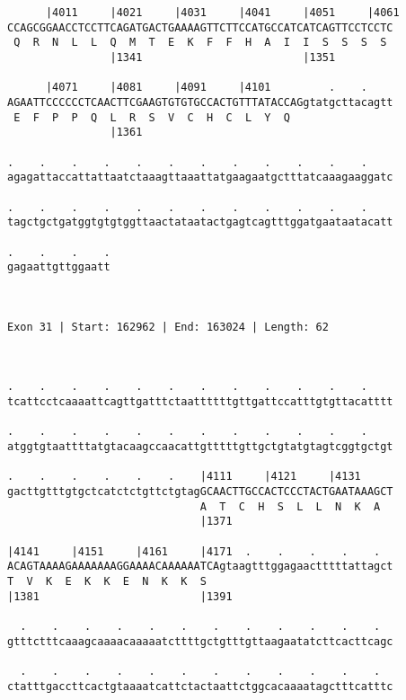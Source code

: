 \documentclass{article}
\begin{document}
\begin{Verbatim}
      |4011     |4021     |4031     |4041     |4051     |4061
CCAGCGGAACCTCCTTCAGATGACTGAAAAGTTCTTCCATGCCATCATCAGTTCCTCCTC
 Q  R  N  L  L  Q  M  T  E  K  F  F  H  A  I  I  S  S  S  S 
                |1341                         |1351         
  
      |4071     |4081     |4091     |4101         .    .    
AGAATTCCCCCCTCAACTTCGAAGTGTGTGCCACTGTTTATACCAGgtatgcttacagtt
 E  F  P  P  Q  L  R  S  V  C  H  C  L  Y  Q                
                |1361                                       
  
.    .    .    .    .    .    .    .    .    .    .    .    
agagattaccattattaatctaaagttaaattatgaagaatgctttatcaaagaaggatc
                                                            
.    .    .    .    .    .    .    .    .    .    .    .    
tagctgctgatggtgtgtggttaactataatactgagtcagtttggatgaataatacatt
                                                            
.    .    .    .
gagaattgttggaatt
                
                
 
Exon 31 | Start: 162962 | End: 163024 | Length: 62



.    .    .    .    .    .    .    .    .    .    .    .    
tcattcctcaaaattcagttgatttctaattttttgttgattccatttgtgttacatttt
                                                            
.    .    .    .    .    .    .    .    .    .    .    .    
atggtgtaattttatgtacaagccaacattgtttttgttgctgtatgtagtcggtgctgt
                                                            
.    .    .    .    .    .    |4111     |4121     |4131     
gacttgtttgtgctcatctctgttctgtagGCAACTTGCCACTCCCTACTGAATAAAGCT
                              A  T  C  H  S  L  L  N  K  A  
                              |1371                         
  
|4141     |4151     |4161     |4171  .    .    .    .    .  
ACAGTAAAAGAAAAAAAGGAAAACAAAAAATCAgtaagtttggagaactttttattagct
T  V  K  E  K  K  E  N  K  K  S                             
|1381                         |1391                         
  
  .    .    .    .    .    .    .    .    .    .    .    .  
gtttctttcaaagcaaaacaaaaatcttttgctgtttgttaagaatatcttcacttcagc
                                                            
  .    .    .    .    .    .    .    .    .    .    .    .  
ctatttgaccttcactgtaaaatcattctactaattctggcacaaaatagctttcatttc
                                                            

\end{Verbatim}
\end{document}
